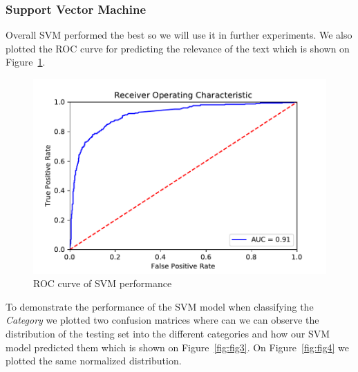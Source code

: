 \documentclass[11pt,a4paper]{article}
\begin{document}
\subsubsection{Support Vector Machine}


Overall SVM performed the best so we will use it in further experiments.
We also plotted the ROC curve for predicting the relevance of the text which is shown on Figure~\ref{fig:fig2}.

\begin{figure}[h]
    \centering
    \includegraphics[width=1.0\columnwidth]{Figures/rocsvm.pdf}
    \caption{ROC curve of SVM performance}
    \label{fig:fig2}
\end{figure}

To demonstrate the performance of the SVM model when classifying the \textit{Category} we plotted two confusion matrices where can we can observe the distribution of the testing set into the different categories and how our SVM model predicted them which is shown on Figure~\ref{fig:fig3}.
On Figure~\ref{fig:fig4} we plotted the same normalized distribution.
\end{document}

